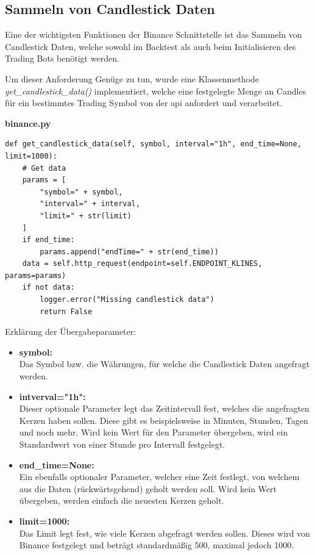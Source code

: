 \documentclass[oneside]{ausarbeitung}
\begin{document}
\subsection{Sammeln von Candlestick Daten}
\label{sub:sammeln_von_candlestick_daten}

Eine der wichtigsten Funktionen der Binance Schnittstelle ist das Sammeln von Candlestick Daten, welche sowohl im Backtest als auch beim Initialisieren des Trading Bots benötigt werden.

Um dieser Anforderung Genüge zu tun, wurde eine Klassenmethode \textit{get\_candlestick\_data()} implementiert, welche eine festgelegte Menge an Candles für ein bestimmtes Trading Symbol von der \ac{api} anfordert und verarbeitet.

\lstset{language=Python}
\lstset{frame=lines}
\lstset{basicstyle=\footnotesize}
\textbf{binance.py}
\begin{lstlisting}
def get_candlestick_data(self, symbol, interval="1h", end_time=None, limit=1000):
	# Get data
	params = [
		"symbol=" + symbol,
		"interval=" + interval,
		"limit=" + str(limit)
	]
	if end_time:
		params.append("endTime=" + str(end_time))
	data = self.http_request(endpoint=self.ENDPOINT_KLINES, params=params)
	if not data:
		logger.error("Missing candlestick data")
		return False
\end{lstlisting}

Erklärung der Übergabeparameter:
\begin{itemize}
	\item \textbf{symbol:} \\
		Das Symbol bzw. die Währungen, für welche die Candlestick Daten angefragt
		werden.
	\item \textbf{intverval="1h":} \\
		Dieser optionale Parameter legt das Zeitintervall fest, welches die 
		angefragten Kerzen haben sollen. Diese gibt es beispielsweise in Minuten, 
		Stunden, Tagen und noch mehr. Wird kein Wert für den Parameter übergeben, 
		wird ein Standardwert von einer Stunde pro Intervall festgelegt.
	\item \textbf{end\_time=None:} \\
		Ein ebenfalls optionaler Parameter, welcher eine Zeit festlegt, von
		welchem aus die Daten (rückwärtsgehend) geholt werden soll. Wird kein
		Wert übergeben, werden einfach die neuesten Kerzen geholt.
	\item \textbf{limit=1000:} \\
		Das Limit legt fest, wie viele Kerzen abgefragt werden sollen. Dieses wird
		von Binance festgelegt und beträgt standardmäßig 500, maximal jedoch 1000.
\end{itemize}
\end{document}
